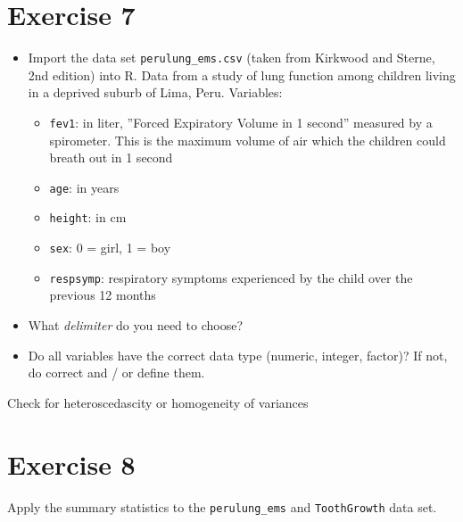 \documentclass[11pt]{article}\usepackage[]{graphicx}\usepackage[]{color}
\begin{document}
\section*{Exercise 7}
\begin{itemize}
\item Import the data set \texttt{perulung\_ems.csv} (taken from Kirkwood and
Sterne, 2nd edition) into R. \newline
Data from a study of lung function among children living in a deprived suburb of
Lima, Peru. \newline
Variables:
\begin{itemize}
\item \texttt{fev1}:  in liter, ''Forced Expiratory Volume in 1 second'' measured
by a spirometer. This is the maximum volume of air which the children could breath
out in 1 second
\item \texttt{age}: in years
\item \texttt{height}: in cm
\item \texttt{sex}: 0 = girl, 1 = boy
\item \texttt{respsymp}: respiratory symptoms experienced by the child over the
previous 12 months
\end{itemize}
\item What \textit{delimiter} do you need to choose?

\item Do all variables have the correct data type (numeric, integer, factor)?
If not, do correct and / or define them.

\end{itemize}
%

%
Check for heteroscedascity or homogeneity of variances

%
\section*{Exercise 8}
Apply the summary statistics to the \texttt{perulung\_ems} and \texttt{ToothGrowth}
data set.

%
\end{document}

